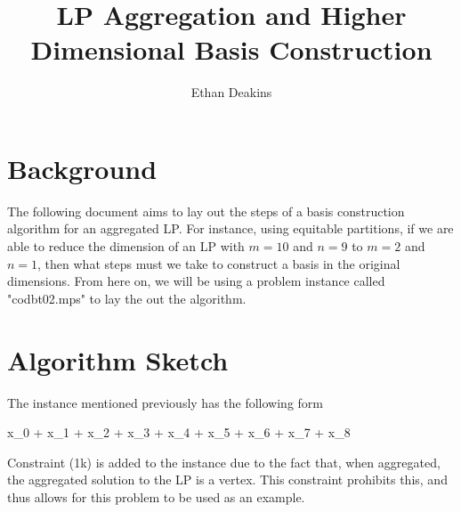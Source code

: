\documentclass[11pt]{article} %
\title{LP Aggregation and Higher Dimensional Basis Construction}
\author{Ethan Deakins}
\begin{document}
 	\maketitle
 	
 	\section*{Background}
 	The following document aims to lay out the steps of a basis construction algorithm for an aggregated LP.  For instance, using equitable partitions, if we are able to reduce the dimension of an LP with $m = 10$ and $n = 9$ to $m = 2$ and $n = 1$, then what steps must we take to construct a basis in the original dimensions.  From here on, we will be using a problem instance called "codbt02.mps" to lay the out the algorithm.
 	
 	\section*{Algorithm Sketch}
 	The instance mentioned previously has the following form 
 	
	 \begin{mini!}
	 	{}{x_0 + x_1 + x_2 + x_3 + x_4 + x_5 + x_6 + x_7 + x_8}{}{}
	 \end{mini!}	
 
	Constraint (1k) is added to the instance due to the fact that, when aggregated, the aggregated solution to the LP is a vertex.  This constraint prohibits this, and thus allows for this problem to be used as an example.
	
\end{document}
